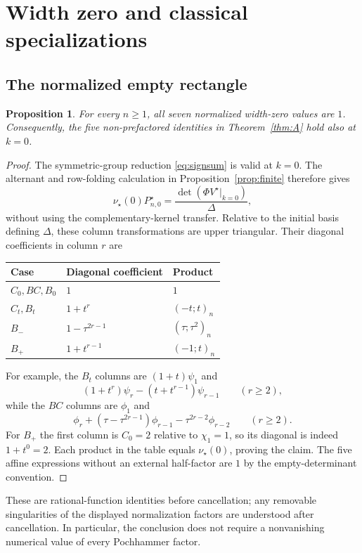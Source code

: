 \documentclass[12pt]{article}
\newtheorem{proposition}[theorem]{Proposition}
\numberwithin{equation}{section}
\newcommand{\ph}{\phi}
\newcommand{\ps}{\psi}
\begin{document}
\section{Width zero and classical specializations}\label{sec:boundary}

\subsection{The normalized empty rectangle}

\begin{proposition}
For every $n\ge1$, all seven normalized width-zero values are $1$.
Consequently, the five non-prefactored identities in
Theorem~\ref{thm:A} hold also at $k=0$.
\end{proposition}

\begin{proof}
The symmetric-group reduction \eqref{eq:signsum} is valid at $k=0$.
The alternant and row-folding calculation in Proposition~\ref{prop:finite}
therefore gives
\[
 \nu_\star(0)P^\star_{n,0}
 =\frac{\det(\Phi V^\star|_{k=0})}{\Delta},
\]
without using the complementary-kernel transfer.
Relative to the initial basis defining $\Delta$, these column
transformations are upper triangular.  Their diagonal coefficients in
column $r$ are
\begin{center}
\renewcommand{\arraystretch}{1.2}
\begin{tabular}{@{}lll@{}}
\toprule
Case & Diagonal coefficient & Product\\
\midrule
$C_0,BC,B_0$ & $1$ & $1$\\
$C_t,B_t$ & $1+t^r$ & $(-t;t)_n$\\
$B_-$ & $1-\tau^{2r-1}$ & $(\tau;\tau^2)_n$\\
$B_+$ & $1+t^{r-1}$ & $(-1;t)_n$\\
\bottomrule
\end{tabular}
\end{center}
For example, the $B_t$ columns are $(1+t)\ps_1$ and
\[
 (1+t^r)\ps_r-(t+t^{r-1})\ps_{r-1}\qquad(r\ge2),
\]
while the $BC$ columns are $\ph_1$ and
\[
 \ph_r+(\tau-\tau^{2r-1})\ph_{r-1}
        -\tau^{2r-2}\ph_{r-2}\qquad(r\ge2).
\]
For $B_+$ the first column is $C_0=2$ relative to $\chi_1=1$,
so its diagonal is indeed $1+t^0=2$.
Each product in the table equals $\nu_\star(0)$, proving the claim.
The five affine expressions without an external half-factor are $1$
by the empty-determinant convention.
\end{proof}

These are rational-function identities before cancellation; any
removable singularities of the displayed normalization factors are
understood after cancellation.  In particular, the conclusion does not
require a nonvanishing numerical value of every Pochhammer factor.
\end{document}

